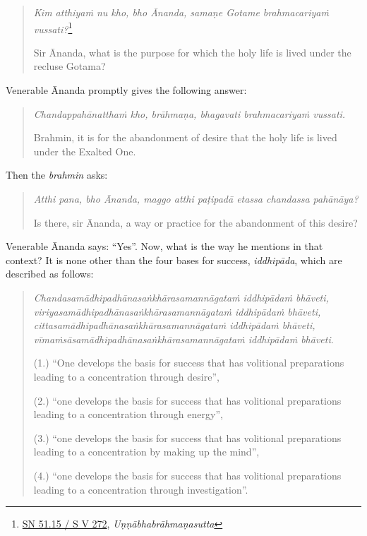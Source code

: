 \begin{quote}
\emph{Kim atthiyaṁ nu kho, bho Ānanda, samaṇe Gotame brahmacariyaṁ vussati?}\footnote{\href{https://suttacentral.net/sn51.15/pli/ms}{SN 51.15 / S V 272}, \emph{Uṇṇābhabrāhmaṇasutta}}

Sir Ānanda, what is the purpose for which the holy life is lived under the recluse Gotama?
\end{quote}

Venerable Ānanda promptly gives the following answer:

\begin{quote}
\emph{Chandappahānatthaṁ kho, brāhmaṇa, bhagavati brahmacariyaṁ vussati.}

Brahmin, it is for the abandonment of desire that the holy life is lived under the Exalted One.
\end{quote}

Then the \emph{brahmin} asks:

\begin{quote}
\emph{Atthi pana, bho Ānanda, maggo atthi paṭipadā etassa chandassa pahānāya?}

Is there, sir Ānanda, a way or practice for the abandonment of this desire?
\end{quote}

Venerable Ānanda says: ``Yes''. Now, what is the way he mentions in that context? It is none other than the four bases for success, \emph{iddhipāda}, which are described as follows:

\begin{quote}
\emph{Chandasamādhipadhānasaṅkhārasamannāgataṁ iddhipādaṁ bhāveti,}\\
\emph{viriyasamādhipadhānasaṅkhārasamannāgataṁ iddhipādaṁ bhāveti,}\\
\emph{cittasamādhipadhānasaṅkhārasamannāgataṁ iddhipādaṁ bhāveti,}\\
\emph{vīmaṁsāsamādhipadhānasaṅkhārasamannāgataṁ iddhipādaṁ bhāveti}.

(1.) ``One develops the basis for success that has volitional preparations leading to a concentration through desire'',

(2.) ``one develops the basis for success that has volitional preparations leading to a concentration through energy'',

(3.) ``one develops the basis for success that has volitional preparations leading to a concentration by making up the mind'',

(4.) ``one develops the basis for success that has volitional preparations leading to a concentration through investigation''.
\end{quote}

